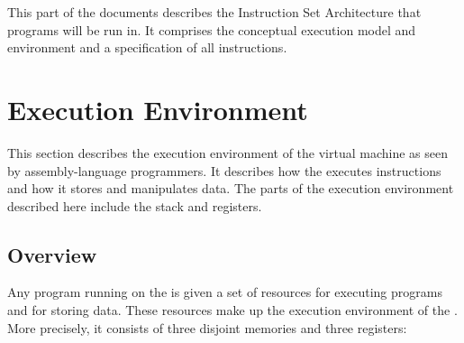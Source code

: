 
This part of the documents describes the Instruction Set Architecture that \civic{} programs will be run in. It comprises the conceptual execution model and environment and a specification of all instructions.

\section{Execution Environment}

This section describes the execution environment of the virtual machine as seen by assembly-language programmers. It describes how the \civicvm{} executes instructions and how it stores and manipulates data. The parts of the execution environment described here include the stack and registers.

\subsection{Overview}

Any program running on the \civicvm{} is given a set of resources for executing programs and for storing data. These resources make up the execution environment of the \civicvm{}. More precisely, it consists of three disjoint memories and three registers:

